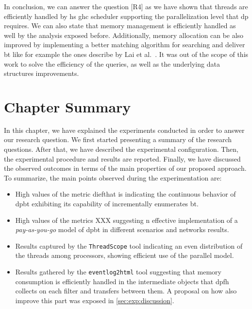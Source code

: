In conclusion, we can answer the question [R4] as we have shown that threads are efficiently handled by \acrshort{hs} \acrshort{ghc} scheduler supporting the parallelization level that \acrshort{dp} requires. 
We can also state that memory management is efficiently handled as well by the analysis exposed before.
Additionally, memory allocation can be also improved by implementing a better matching algorithm for searching and deliver \acrshort{bt} like for example the ones describe by Lai et al.~\cite{Lai}. 
It was out of the scope of this work to solve the efficiency of the queries, as well as the underlying data structures improvements. 


\section{Chapter Summary}
In this chapter, we have explained the experiments conducted in order to answer our research question.
We first started presenting a summary of the research questions. After that, we have described the experimental configuration.
Then, the experimental procedure and results are reported. Finally, we have discussed the observed outcomes in terms of the main properties of our proposed approach.
To summarize, the main points observed during the experimentation are:
\begin{itemize}
  \item High values of the metric dief\@t that is indicating the continuous behavior of \acrshort{dpbt} exhibiting its capability of incrementally enumerates \acrshort{bt}.
  \item High values of the metrics XXX suggesting n effective implementation of a \emph{pay-as-you-go} model of \acrshort{dpbt} in  different scenarios and networks results.
  \item Results captured by the \texttt{ThreadScope} tool indicating an even distribution of the threads among processors, showing efficient use of the parallel model.
  \item Results gathered by the \texttt{eventlog2html} tool suggesting that memory consumption is efficiently handled in the intermediate objects that \acrshort{dpfh} collects on each filter and transfers between them. A proposal on how also improve this part was exposed in \autoref{sec:exp:discussion}.
\end{itemize} 
